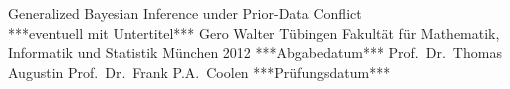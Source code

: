 \documentclass[12pt]{book}
\begin{document}
  \frontmatter


  \LMUTitle
      {Generalized Bayesian Inference under Prior-Data Conflict\\
       ***eventuell mit Untertitel***}         %
      {Gero Walter     }                       %
      {T\"ubingen}                             %
      {Fakult\"at f\"ur Mathematik, Informatik und Statistik} %
      {M\"unchen 2012}                         %
      {***Abgabedatum***}                            %
      {Prof.\ Dr.\ Thomas Augustin}            %
      {Prof.\ Dr.\ Frank P.A.\ Coolen}         %
      {***Pr\"ufungsdatum***}                  %


  \tableofcontents

  \listoffigures

  \listoftables
  \cleardoublepage

  

  

  

\mainmatter\setcounter{page}{1}
  
  
  
  \begin{appendix}
  
%  
  \end{appendix}


  \backmatter

  
  



%  
\end{document}
